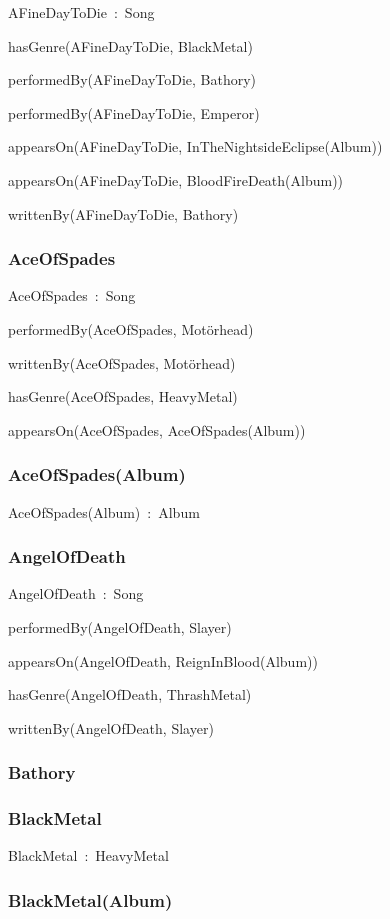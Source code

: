 \documentclass{article}
\begin{document}
AFineDayToDie~:~Song

hasGenre(AFineDayToDie, BlackMetal)

performedBy(AFineDayToDie, Bathory)

performedBy(AFineDayToDie, Emperor)

appearsOn(AFineDayToDie, InTheNightsideEclipse(Album))

appearsOn(AFineDayToDie, BloodFireDeath(Album))

writtenBy(AFineDayToDie, Bathory)

\subsubsection*{AceOfSpades}

AceOfSpades~:~Song

performedBy(AceOfSpades, Motörhead)

writtenBy(AceOfSpades, Motörhead)

hasGenre(AceOfSpades, HeavyMetal)

appearsOn(AceOfSpades, AceOfSpades(Album))

\subsubsection*{AceOfSpades(Album)}

AceOfSpades(Album)~:~Album

\subsubsection*{AngelOfDeath}

AngelOfDeath~:~Song

performedBy(AngelOfDeath, Slayer)

appearsOn(AngelOfDeath, ReignInBlood(Album))

hasGenre(AngelOfDeath, ThrashMetal)

writtenBy(AngelOfDeath, Slayer)

\subsubsection*{Bathory}

\subsubsection*{BlackMetal}

BlackMetal~:~HeavyMetal

\subsubsection*{BlackMetal(Album)}
\end{document}
